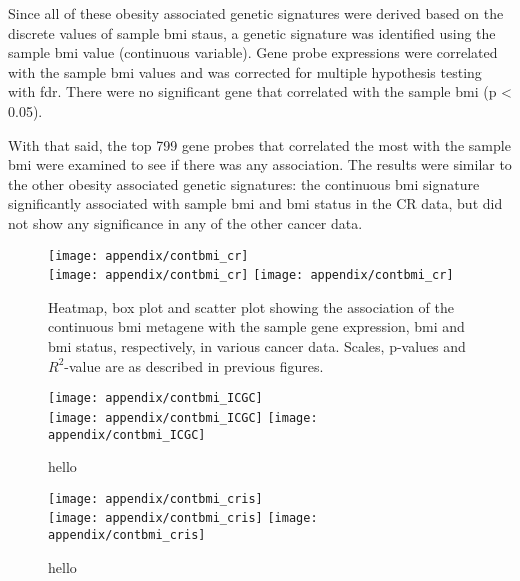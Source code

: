 \begin{appendices}
	Since all of these obesity associated genetic signatures were derived based on the discrete values of sample \gls{bmi} staus, a genetic signature was identified using the sample \gls{bmi} value (continuous variable).
	Gene probe expressions were correlated with the sample \gls{bmi} values and was corrected for multiple hypothesis testing with \gls{fdr}.
	There were no significant gene that correlated with the sample \gls{bmi} (p \textless{} 0.05).

	With that said, the top 799 gene probes that correlated the most with the sample \gls{bmi} were examined to see if there was any association.
	The results were similar to the other obesity associated genetic signatures: the continuous \gls{bmi} signature significantly associated with sample \gls{bmi} and \gls{bmi} status in the CR data, but did not show any significance in any of the other cancer data.

	\begin{figure}[htp!]
		\centering
		\texttt{[image: appendix/contbmi\_cr]}\\
		\texttt{[image: appendix/contbmi\_cr]}
		\hfill
		\texttt{[image: appendix/contbmi\_cr]}
		\caption[Continuous \gls{bmi} metagene in various cancer data]{Heatmap, box plot and scatter plot showing the association of the continuous \gls{bmi} metagene with the sample gene expression, \gls{bmi} and \gls{bmi} status, respectively, in various cancer data.
		Scales, p-values and $R^2$-value are as described in previous figures.}
		\label{fig:cont_bmi}
	\end{figure}

	\begin{figure}[htp!]
		\ContinuedFloat
		\captionsetup{list=off,format=cont}
		\centering
		\texttt{[image: appendix/contbmi\_ICGC]}\\
		\texttt{[image: appendix/contbmi\_ICGC]}
		\hfill
		\texttt{[image: appendix/contbmi\_ICGC]}
		\caption{hello}
	\end{figure}

	\begin{figure}[htp!]
		\ContinuedFloat
		\captionsetup{list=off,format=cont}
		\centering
		\texttt{[image: appendix/contbmi\_cris]}\\
		\texttt{[image: appendix/contbmi\_cris]}
		\hfill
		\texttt{[image: appendix/contbmi\_cris]}
		\caption{hello}
	\end{figure}


\end{appendices}
